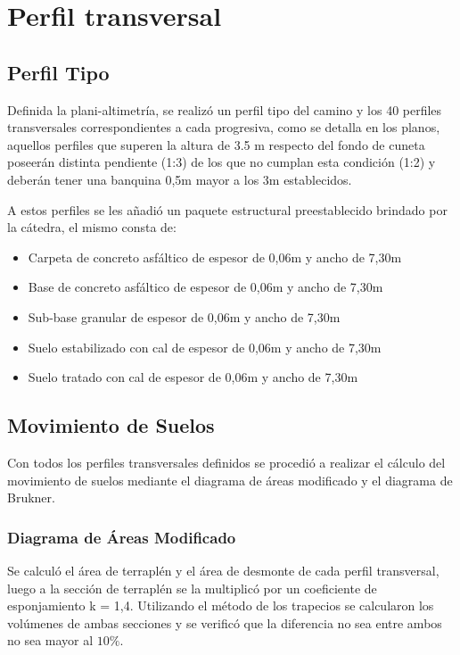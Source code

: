 \documentclass[../main.tex]{subfiles}
\begin{document}
\section{Perfil transversal}

\subsection{Perfil Tipo}
Definida la plani-altimetría, se realizó un perfil tipo del camino y los 40 perfiles transversales correspondientes a cada progresiva, como se detalla en los planos, aquellos perfiles que superen la altura de 3.5 m respecto del fondo de cuneta poseerán distinta pendiente (1:3) de los que no cumplan esta condición (1:2) y deberán tener una banquina 0,5m mayor a los 3m establecidos.

A estos perfiles se les añadió un paquete estructural preestablecido brindado por la cátedra, el mismo consta de:

\begin{itemize}
    \item Carpeta de concreto asfáltico de espesor de 0,06m y ancho de 7,30m 
    \item Base de concreto asfáltico de espesor de 0,06m y ancho de 7,30m 
    \item Sub-base granular de espesor de 0,06m y ancho de 7,30m 
    \item Suelo estabilizado con cal de espesor de 0,06m y ancho de 7,30m 
    \item Suelo tratado con cal de espesor de 0,06m y ancho de 7,30m
\end{itemize}



\subsection{Movimiento de Suelos}
Con todos los perfiles transversales definidos se procedió a realizar el cálculo del movimiento de suelos mediante el diagrama de áreas modificado y el diagrama de Brukner.

\subsubsection{Diagrama de Áreas Modificado}

Se calculó el área de terraplén y el área de desmonte de cada perfil transversal, luego a la sección de terraplén se la multiplicó por un coeficiente de esponjamiento k = 1,4. Utilizando el método de los trapecios se calcularon los volúmenes de ambas secciones y se verificó que la diferencia no sea entre ambos no sea mayor al $10\%$.
\end{document}
